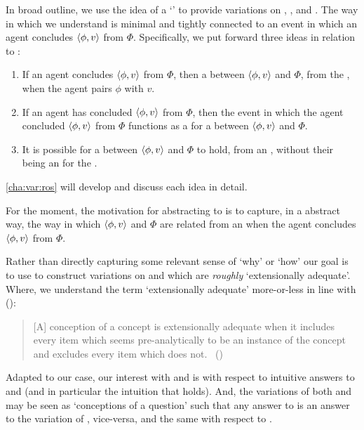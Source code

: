 \begin{note}
  In broad outline, we use the idea of a `' to provide variations on \qWhy{}, \qHow{}, and \issueInclusion{}.
  The way in which we understand  is minimal and tightly connected to an event in which an agent concludes \(\langle \phi, v \rangle\) from \(\Phi\).
  Specifically, we put forward three ideas in relation to :
  \begin{enumerate}
  \item
    If an agent concludes \(\langle \phi, v \rangle\) from \(\Phi\), then a  between \(\langle \phi, v \rangle\) and \(\Phi\), from the \agpe{}, when the agent pairs \(\phi\) with \(v\).
  \item
    If an agent has concluded \(\langle \phi, v \rangle\) from \(\Phi\), then the event in which the agent concluded \(\langle \phi, v \rangle\) from \(\Phi\) functions as a  for a  between \(\langle \phi, v \rangle\) and \(\Phi\).
  \item
    It is possible for a  between \(\langle \phi, v \rangle\) and \(\Phi\) to hold, from an \agpe{}, without their being an  for the .
  \end{enumerate}

  \autoref{cha:var:ros} will develop and discuss each idea in detail.

  For the moment, the motivation for abstracting to  is to capture, in a abstract way, the way in which \(\langle \phi, v \rangle\) and \(\Phi\) are related from an \agpe{} when the agent concludes \(\langle \phi, v \rangle\) from \(\Phi\).

  Rather than directly capturing some relevant sense of `why' or `how' our goal is to use  to construct variations on \qWhy{} and \qHow{} which are \emph{roughly} `extensionally adequate'.
  Where, we understand the term `extensionally adequate' more-or-less in line with \citeauthor{Sumner:1987aa} (\citeyear{Sumner:1987aa}):

  \begin{quote}
    [A] conception of a concept is extensionally adequate when it includes every item which seems pre-analytically to be an instance of the concept and excludes every item which does not.%
    \mbox{ }\hfill\mbox{(\citeyear[49]{Sumner:1987aa})}
  \end{quote}

  Adapted to our case, our interest with \qWhy{} and \qHow{} is with respect to intuitive answers to \qWhy{} and \qHow{} (and in particular the intuition that \issueInclusion{} holds).
  And, the variations of both \qWhy{} and \qHow{} may be seen as `conceptions of a question' such that any answer to \qWhy{} is an answer to the variation of \qWhy{}, vice-versa, and the same with respect to \qHow{}.


\end{note}
